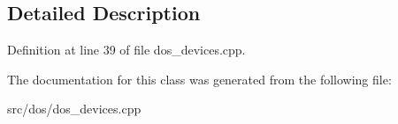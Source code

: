 \subsection{Detailed Description}


Definition at line 39 of file dos\-\_\-devices.\-cpp.



The documentation for this class was generated from the following file\-:\begin{DoxyCompactItemize}
\item 
src/dos/dos\-\_\-devices.\-cpp\end{DoxyCompactItemize}
